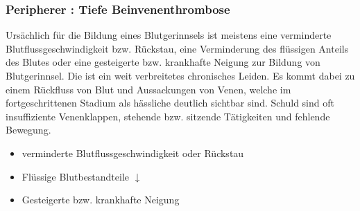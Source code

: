 \clearpage%


\subsubsection{Peripherer : 
Tiefe Beinvenenthrombose}
\label{topic:venenthrombose}
\label{topic:thrombose}




{%
Ursächlich für die Bildung eines Blutgerinnsels ist meistens
eine verminderte Blutflussgeschwindigkeit bzw. Rückstau,
eine Verminderung des flüssigen Anteils des Blutes oder eine gesteigerte bzw.
krankhafte Neigung zur Bildung von Blutgerinnsel. Die  ist ein weit verbreitetes chronisches Leiden.
 Es kommt dabei zu einem Rückfluss von Blut und Aussackungen
 von Venen, welche im fortgeschrittenen Stadium als hässliche
 deutlich sichtbar sind. Schuld sind oft
insuffiziente Venenklappen, stehende bzw. sitzende
Tätigkeiten und fehlende Bewegung.

}{
\begin{itemize}
  \item verminderte Blutflussgeschwindigkeit oder Rückstau
  \item Flüssige Blutbestandteile
  $\downarrow$ 
  \item Gesteigerte bzw. krankhafte Neigung
\end{itemize}
}{}{}{}



